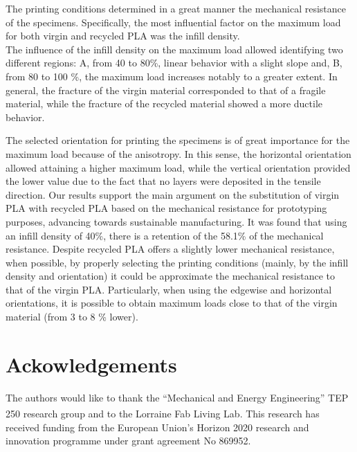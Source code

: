 \documentclass[]{interact}
\theoremstyle{plain}%
\theoremstyle{definition}
\theoremstyle{remark}
\begin{document}
The printing conditions determined in a great manner the mechanical
resistance of the specimens. Specifically, the most influential factor
on the maximum load for both virgin and recycled PLA was the infill
density.\\
The influence of the infill density on the maximum load allowed
identifying two different regions: A, from 40 to 80\%, linear behavior
with a slight slope and, B, from 80 to 100 \%, the maximum load
increases notably to a greater extent. In general, the fracture of the
virgin material corresponded to that of a fragile material, while the
fracture of the recycled material showed a more ductile behavior.

The selected orientation for printing the specimens is of great
importance for the maximum load because of the anisotropy. In this
sense, the horizontal orientation allowed attaining a higher maximum
load, while the vertical orientation provided the lower value due to the
fact that no layers were deposited in the tensile direction. Our results
support the main argument on the substitution of virgin PLA with
recycled PLA based on the mechanical resistance for prototyping
purposes, advancing towards sustainable manufacturing. It was found that
using an infill density of 40\%, there is a retention of the 58.1\% of
the mechanical resistance. Despite recycled PLA offers a slightly lower
mechanical resistance, when possible, by properly selecting the printing
conditions (mainly, by the infill density and orientation) it could be
approximate the mechanical resistance to that of the virgin PLA.
Particularly, when using the edgewise and horizontal orientations, it is
possible to obtain maximum loads close to that of the virgin material
(from 3 to 8 \% lower).

\hypertarget{ackowledgements}{%
\section{Ackowledgements}\label{ackowledgements}}

The authors would like to thank the ``Mechanical and Energy
Engineering'' TEP 250 research group and to the Lorraine Fab Living
Lab\textsuperscript{\textregistered}. This research has received funding
from the European Union's Horizon 2020 research and innovation programme
under grant agreement No 869952.



\end{document}
